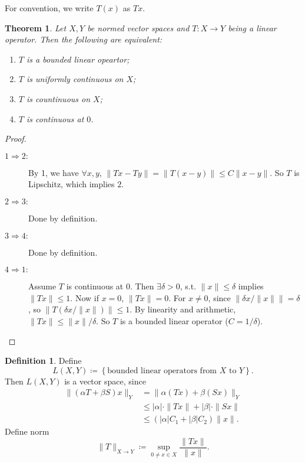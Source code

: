 \documentclass[12pt]{article}
\theoremstyle{plain}
\newtheorem{thm}{Theorem}
\theoremstyle{definition}
\newtheorem*{defn}{Definition}
\begin{document}
For convention, we write $T(x)$ as $Tx$.
\begin{thm}
    Let $X, Y$ be normed vector spaces and $T: X\rightarrow Y$ being a linear operator.
    Then the following are equivalent:
    \begin{enumerate}
        \item $T$ is a bounded linear opeartor;
        \item $T$ is uniformly continuous on $X$;
        \item $T$ is countinuous on $X$;
        \item $T$ is continuous at $0$.
    \end{enumerate}
\end{thm}
\begin{proof}
    \begin{description}
        \item[$1\Rightarrow 2:$] By 1, we have $\forall x,y$, $\|Tx - Ty\| = \|T(x-y)\| \leq C\|x-y\|$.
            So $T$ is Lipschitz, which implies $2$.
        \item[$2\Rightarrow 3:$] Done by definition.
        \item[$3\Rightarrow 4:$] Done by definition.
        \item[$4\Rightarrow 1:$] Assume $T$ is continuous at $0$.
            Then $\exists \delta > 0$, s.t. $\|x\|\leq \delta$ implies $\|Tx\| \leq 1$.
            Now if $x=0$, $\|Tx\| = 0$.
            For $x\neq 0$, since $\left\|\delta x/\|x\|\right\| = \delta$, so $\left\|T(\delta x/\|x\|)\right\|\leq 1$.
            By linearity and arithmetic, 
            $\|Tx\|\leq \|x\|/\delta$.
            So $T$ is a bounded linear operator ($C=1/\delta$).
    \end{description}
\end{proof}

\begin{defn}
    Define
    \[
        L(X,Y)\coloneqq \left\{\text{bounded linear operators from }X\text{ to }Y\right\}.
    \]
    Then $L(X,Y)$ is a vector space, since
    \[\begin{aligned}
            \|(\alpha T+\beta S) x\|_Y & = \|\alpha(Tx) + \beta(Sx)\|_Y\\
                                       &\leq |\alpha|\cdot\|Tx\| + |\beta|\cdot \|Sx\|\\
                                       &\leq (|\alpha| C_1 + |\beta| C_2)\|x\|.
    \end{aligned}\]
    Define norm
    \[
        \|T\|_{X\rightarrow Y} \coloneqq \sup_{0\neq x\in X}\frac{\|Tx\|}{\|x\|}.
    \]
\end{defn}
\end{document}
